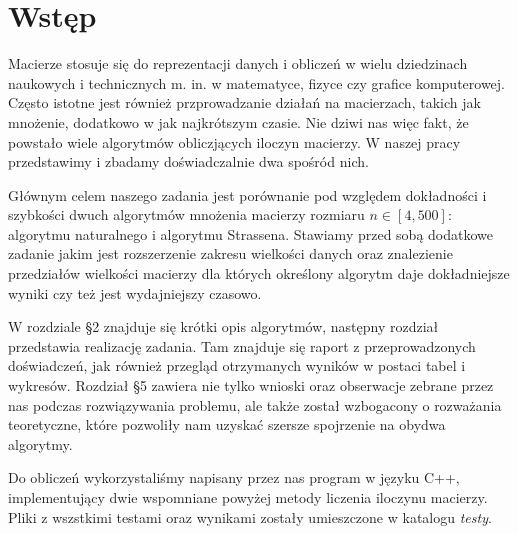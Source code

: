 \section{Wstęp}
Macierze stosuje się do reprezentacji danych i obliczeń w wielu dziedzinach naukowych i technicznych m. in. w matematyce, fizyce czy grafice komputerowej. Często istotne jest również przprowadzanie działań na macierzach, takich jak mnożenie, dodatkowo w jak najkrótszym czasie. Nie dziwi nas więc fakt, że powstało wiele algorytmów obliczjących iloczyn macierzy. W naszej pracy przedstawimy i zbadamy doświadczalnie dwa spośród nich.

Głównym celem naszego zadania jest porównanie pod względem dokładności i szybkości dwuch algorytmów mnożenia macierzy rozmiaru $n \in [4, 500]$: algorytmu naturalnego i algorytmu Strassena. Stawiamy przed sobą dodatkowe zadanie jakim jest rozszerzenie zakresu wielkości danych oraz znalezienie przedziałów wielkości macierzy dla których określony algorytm daje dokładniejsze wyniki czy też jest wydajniejszy czasowo.

W rozdziale \S2 znajduje się krótki opis algorytmów, następny rozdział przedstawia realizację zadania. Tam znajduje się raport z przeprowadzonych doświadczeń, jak również przegląd otrzymanych wyników w postaci tabel i wykresów. Rozdział \S 5 zawiera nie tylko wnioski oraz obserwacje zebrane przez nas podczas rozwiązywania problemu, ale także został wzbogacony o rozważania teoretyczne, które pozwoliły nam uzyskać szersze spojrzenie na obydwa algorytmy.

Do obliczeń wykorzystaliśmy napisany przez nas program w języku C++, implementujący dwie wspomniane powyżej metody liczenia iloczynu macierzy. Pliki z wszstkimi testami oraz wynikami zostały umieszczone w katalogu \textit{testy}.   
